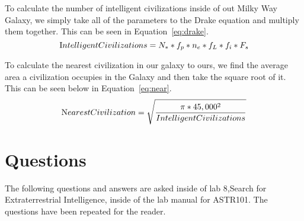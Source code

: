 \documentclass{article}
\begin{document}
To calculate the number of intelligent civilizations inside of out Milky Way Galaxy, we simply take all of the parameters to the
Drake equation and multiply them together. This can be seen in Equation~\ref{eq:drake}.
\begin{equation}
\label{eq:drake}
\text Intelligent Civilizations = {N}_{*} * {f}_{p} * {n}_{e} * {f}_{L} * {f}_{i} * {F}_{s}
\end{equation}

To calculate the nearest civilization in our galaxy to ours, we find the average area a civilization occupies in the Galaxy and then 
take the square root of it. This can be seen below in Equation~\ref{eq:near}.
\begin{equation}
\label{eq:near}
\text Nearest Civilization = \sqrt{\frac{\pi * 45,000^{2}}{Intelligent Civilizations}}
\end{equation}




\section{Questions}
\label{sec:qna}

The following questions and answers are asked inside of lab 8,Search for Extraterrestrial Intelligence, inside of the lab manual
for ASTR101. The questions have been repeated for the reader.
\end{document}
